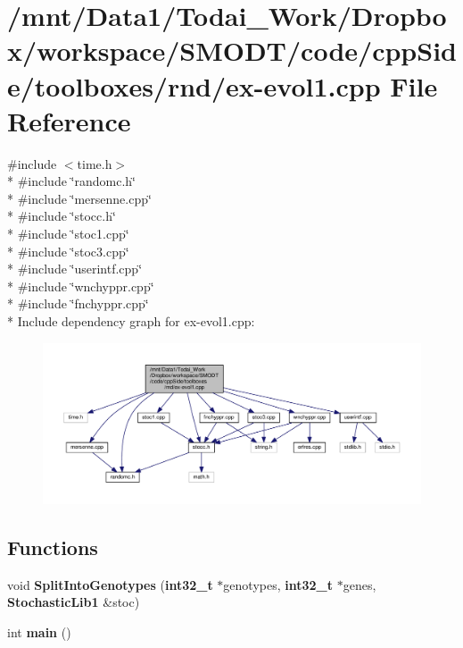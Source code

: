 \section{/mnt/\-Data1/\-Todai\-\_\-\-Work/\-Dropbox/workspace/\-S\-M\-O\-D\-T/code/cpp\-Side/toolboxes/rnd/ex-\/evol1.cpp File Reference}
\label{toolboxes_2rnd_2ex-evol1_8cpp}
{\ttfamily \#include $<$time.\-h$>$}\\*
{\ttfamily \#include \char`\"{}randomc.\-h\char`\"{}}\\*
{\ttfamily \#include \char`\"{}mersenne.\-cpp\char`\"{}}\\*
{\ttfamily \#include \char`\"{}stocc.\-h\char`\"{}}\\*
{\ttfamily \#include \char`\"{}stoc1.\-cpp\char`\"{}}\\*
{\ttfamily \#include \char`\"{}stoc3.\-cpp\char`\"{}}\\*
{\ttfamily \#include \char`\"{}userintf.\-cpp\char`\"{}}\\*
{\ttfamily \#include \char`\"{}wnchyppr.\-cpp\char`\"{}}\\*
{\ttfamily \#include \char`\"{}fnchyppr.\-cpp\char`\"{}}\\*
Include dependency graph for ex-\/evol1.cpp\-:\nopagebreak
\begin{figure}[H]
\begin{center}
\leavevmode
\includegraphics[width=350pt]{toolboxes_2rnd_2ex-evol1_8cpp__incl}
\end{center}
\end{figure}
\subsection*{Functions}
\begin{DoxyCompactItemize}
\item 
void {\bf Split\-Into\-Genotypes} ({\bf int32\-\_\-t} $\ast$genotypes, {\bf int32\-\_\-t} $\ast$genes, {\bf Stochastic\-Lib1} \&stoc)
\item 
int {\bf main} ()
\end{DoxyCompactItemize}


